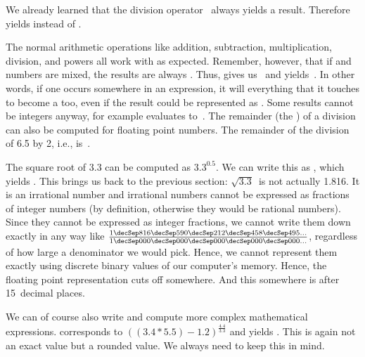 We already learned that the division operator~\pythonilIdx{/} always yields a  result.
Therefore  yields  instead of .

The normal arithmetic operations like addition, subtraction, multiplication, division, and powers all work with  as expected.
Remember, however, that if  and  numbers are mixed, the results are always .
Thus, \pythonIdx{+} gives us~ and  yields~.
In other words, if one  occurs somewhere in an expression, it will  everything that it touches to become a  too, even if the result could be represented as .
Some results cannot be integers anyway, for example \pythonIdx{-} evaluates to~.
The remainder (the ) of a division can also be computed for floating point numbers.
The remainder of the division of 6.5 by 2, i.e., \expandafter{}\pythonIdx{\%} is~.%
%
\begin{sloppypar}%
The square root of 3.3 can be computed as $3.3^{0.5}$.
We can write this as , which yields .
This brings us back to the previous section:
$\sqrt{3.3}$~is not actually 1.816.
It is an irrational number and irrational numbers cannot be expressed as fractions of integer numbers (by definition, otherwise they would be rational numbers).
Since they cannot be expressed as integer fractions, we cannot write them down exactly in any way like $\frac{1\decSep816\decSep590\decSep212\decSep458\decSep495\dots}{1\decSep000\decSep000\decSep000\decSep000\decSep000\dots}$, regardless of how large a denominator we would pick.
Hence, we cannot represent them exactly using discrete binary values of our computer's memory.
Hence, the floating point representation cuts off somewhere.
And this somewhere is after 15~decimal places.%
\end{sloppypar}%
%
\begin{sloppypar}%
We can of course also write and compute more complex mathematical expressions.
\pythonIdx{(}\pythonIdx{)} corresponds to $((3.4*5.5)-1.2)^{\frac{4.4}{3.3}}$ and yields .
This is again not an exact value but a rounded value.
We always need to keep this in mind.%
\end{sloppypar}%

